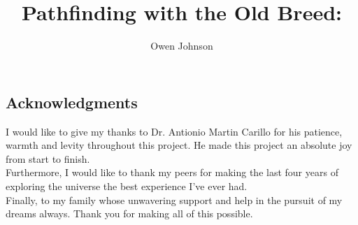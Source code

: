 \documentclass[twocolumn]{aastex631}
\newcommand\aastex{AAS\TeX}
\begin{document}
\title{Pathfinding with the Old Breed:}
\author[0000-0002-5927-0481]{Owen Johnson}



\begin{abstract}


\end{abstract}





{}






\begin{acknowledgments}
    \section*{Acknowledgments}
I would like to give my thanks to Dr. Antionio Martin Carillo for his patience, warmth and levity throughout this project. He made this project an absolute joy from start to finish. \\ Furthermore, I would like to thank my peers for making the last four years of exploring the universe the best experience I've ever had. \\ Finally, to my family whose unwavering support and help in the pursuit of my dreams always. Thank you for making all of this possible. 
\end{acknowledgments}

\appendix
\end{document}
